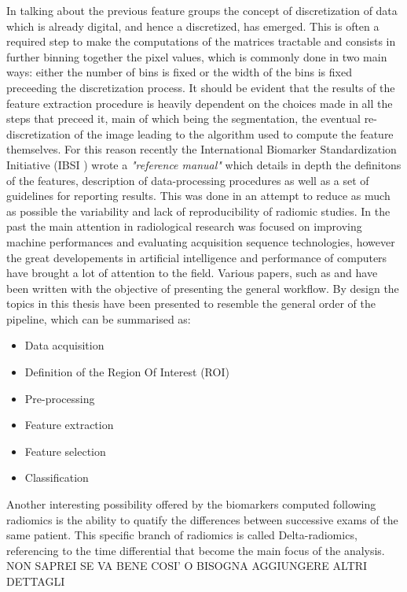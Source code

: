 In talking about the previous feature groups the concept of discretization of data which is already digital, and hence a discretized, has emerged. This is often a required step to make the computations of the matrices tractable and consists in further binning together the pixel values, which is commonly done in two main ways: either the number of bins is fixed or the width of the bins is fixed preceeding the discretization process.
It should be evident that the results of the feature extraction procedure is heavily dependent on the choices made in all the steps that preceed it, main of which being the segmentation, the eventual re-discretization of the image leading to the algorithm used to compute the feature themselves. For this reason recently the International Biomarker Standardization Initiative (IBSI \cite{IBSI}) wrote a \textit{"reference manual"} which details in depth the definitons of the features, description of data-processing procedures as well as a set of guidelines for reporting results. This was done in an attempt to reduce as much as possible the variability and lack of reproducibility of radiomic studies.
In the past the main attention in radiological research was focused on improving machine performances and evaluating acquisition sequence technologies, however the great developements in artificial intelligence and performance of computers have brought a lot of attention to the field. Various papers, such as \cite{Rad_review} and \cite{Rad_review_ger} have been written with the objective of presenting the general workflow. By design the topics in this thesis have been presented to resemble the general order of the pipeline, which can be summarised as:

\begin{itemize}
\item Data acquisition
\item Definition of the Region Of Interest (ROI)
\item Pre-processing
\item Feature extraction
\item Feature selection 
\item Classification
\end{itemize}

Another interesting possibility offered by the biomarkers computed following radiomics is the ability to quatify the differences between successive exams of the same patient. This specific branch of radiomics is called Delta-radiomics, referencing to the time differential that become the main focus of the analysis.
\newline \large{NON SAPREI SE VA BENE COSI' O BISOGNA AGGIUNGERE ALTRI DETTAGLI} \newline

